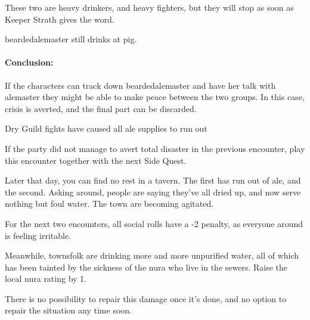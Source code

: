 
These two are heavy drinkers, and heavy fighters, but they will stop as soon as Keeper Strath gives the word.


\Gls{beardedalemaster} still drinks at \gls{pig}.  

\paragraph{Conclusion:} If the characters can track down \gls{beardedalemaster} and have her talk with \gls{alemaster} they might be able to make peace between the two groups.
In this case, crisis is averted, and the final part can be discarded.

\beardedalemaster

{\N\squash Dry}%
{Guild fights have caused all ale supplies to run out}%

If the party did not manage to avert total disaster in the previous encounter, play this encounter together with the next Side Quest.

\begin{boxtext}

  Later that day, you can find no rest in a tavern.  The first has run out of ale, and the second.  Asking around, people are saying they've all dried up, and now serve nothing but foul water.  The town are becoming agitated.

\end{boxtext}

For the next two encounters, all social rolls have a -2 penalty, as everyone around is feeling irritable.

Meanwhile, townsfolk are drinking more and more unpurified water, all of which has been tainted by the sickness of the nura who live in the sewers.  Raise the local nura rating by 1.

There is no possibility to repair this damage once it's done, and no option to repair the situation any time soon.

\stopcontents[sq]
